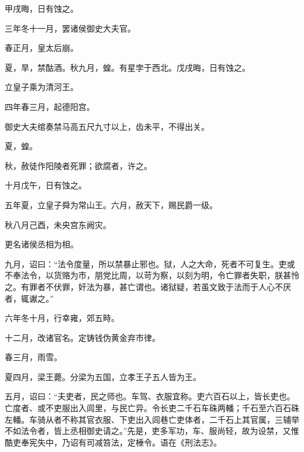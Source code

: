 \documentclass[12pt,UTF8]{ctexbook}
\begin{document}
甲戌晦，日有蚀之。



三年冬十一月，罢诸侯御史大夫官。



春正月，皇太后崩。



夏，旱，禁酤酒。秋九月，蝗。有星孛于西北。戊戌晦，日有蚀之。



立皇子乘为清河王。



四年春三月，起德阳宫。



御史大夫绾奏禁马高五尺九寸以上，齿未平，不得出关。



夏，蝗。



秋，赦徒作阳陵者死罪；欲腐者，许之。



十月戊午，日有蚀之。



五年夏，立皇子舜为常山王。六月，赦天下，赐民爵一级。



秋八月己酉，未央宫东阙灾。



更名诸侯丞相为相。



九月，诏曰：“法令度量，所以禁暴止邪也。狱，人之大命，死者不可复生。吏或不奉法令，以货赂为市，朋党比周，以苛为察，以刻为明，令亡罪者失职，朕甚怜之。有罪者不伏罪，奸法为暴，甚亡谓也。诸狱疑，若虽文致于法而于人心不厌者，辄谳之。”



六年冬十月，行幸雍，郊五畤。



十二月，改诸官名。定铸钱伪黄金弃市律。



春三月，雨雪。



夏四月，梁王薨。分梁为五国，立孝王子五人皆为王。



五月，诏曰：“夫吏者，民之师也。车驾、衣服宜称。吏六百石以上，皆长吏也。亡度者、或不吏服出入闾里，与民亡异。令长吏二千石车硃两轓；千石至六百石硃左轓。车骑从者不称其官衣服、下吏出入闾巷亡吏体者，二千石上其官属，三辅举不如法令者，皆上丞相御史请之。”先是，吏多军功，车、服尚轻，故为设禁，又惟酷吏奉宪失中，乃诏有司减笞法，定棰令。语在《刑法志》。
\end{document}
